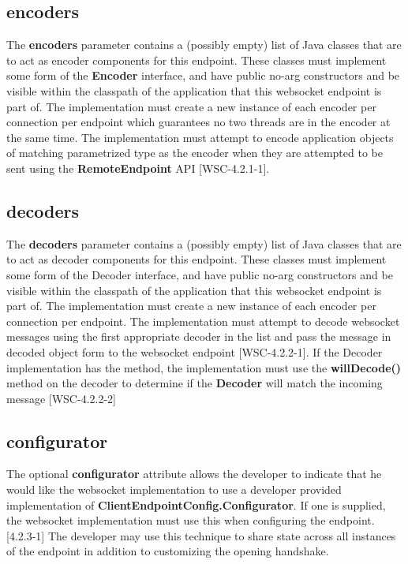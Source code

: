\subsection{encoders}

The \textbf{encoders} parameter contains a (possibly empty) list of Java classes that are to act as encoder components for this endpoint. These classes must implement some form of the \textbf{Encoder} interface, and have public no-arg constructors and be visible within the classpath of the application that this websocket endpoint is part of. The implementation must create a new instance of each encoder per connection per endpoint which guarantees no two threads are in the encoder at the same time. The implementation must attempt to encode application objects of matching parametrized type as the encoder when they are attempted to be sent using the \textbf{RemoteEndpoint} API [WSC-4.2.1-1]. 

\subsection{decoders}

The \textbf{decoders} parameter contains a (possibly empty) list of Java classes that are to act as decoder components for this endpoint. These classes must implement some form of the Decoder interface, and have public no-arg constructors and be visible within the classpath of the application that this websocket endpoint is part of. The implementation must create a new instance of each encoder per connection per endpoint. The implementation must attempt to decode websocket messages using the first appropriate decoder in the list and pass the message in decoded object form to the websocket endpoint [WSC-4.2.2-1]. If the Decoder implementation has the method, the implementation must use the \textbf{willDecode()} method on the decoder to determine if the \textbf{Decoder} will match the incoming message [WSC-4.2.2-2]

\subsection{configurator}

The optional \textbf{configurator} attribute allows the developer to indicate that he would like the websocket implementation to use a developer provided implementation of \textbf{ClientEndpointConfig.Configurator}. If one is supplied, the websocket implementation must use this when configuring the endpoint. [4.2.3-1] The developer may use this technique to share state across all instances of the endpoint in addition to customizing the opening handshake.

